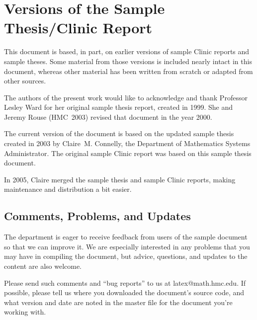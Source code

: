 \chapter{Versions of the Sample Thesis/Clinic Report}
\label{ch:previous_versions}

This document is based, in part, on earlier versions of sample
Clinic reports and sample theses.  Some material from those versions
is included nearly intact in this document, whereas other material
has been written from scratch or adapted from other sources.

The authors of the present work would like to acknowledge and thank
Professor Lesley Ward for her original sample thesis report, created
in 1999.  She and Jeremy Rouse (HMC~2003) revised that document in
the year 2000.

The current version of the document is based on the updated sample
thesis created in 2003 by Claire~M. Connelly, the Department of
Mathematics Systems Administrator.  The original sample Clinic
report was based on this sample thesis document.

In 2005, Claire merged the sample thesis and sample Clinic reports,
making maintenance and distribution a bit easier.


\section{Comments, Problems, and Updates}
\label{sec:feedback}

The department is eager to receive feedback from users of the sample
document so that we can improve it.  We are especially interested in
any problems that you may have in compiling the document, but
advice, questions, and updates to the content are also welcome.

Please send such comments and ``bug reports'' to us at
\textsf{latex@math.hmc.edu}.  If possible, please tell us where you
downloaded the document's source code, and what version and date are
noted in the master file for the document you're working with.


